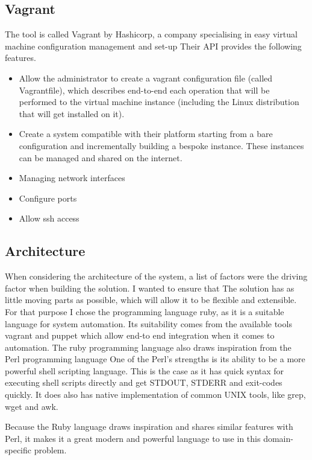 \documentclass{article}
\begin{document}
\subsection{Vagrant}
The tool is called Vagrant by Hashicorp, a company specialising in easy virtual machine configuration management and set-up Their API provides the following features.

	\begin{itemize}
		\item
			Allow the administrator to create a vagrant configuration file (called Vagrantfile), which describes end-to-end each operation that will be performed to the virtual machine instance (including the Linux distribution that will get installed on it).
		\item
			Create a system compatible with their platform starting from a bare configuration and incrementally building a bespoke instance. These instances can be managed and shared on the internet.
		\item
			Managing network interfaces
		\item
			Configure ports
		\item 
			Allow \gls{ssh} access
	\end{itemize}

\subsection{Architecture}
When considering the architecture of the system, a list of factors were the driving factor when building the solution. I wanted to ensure that The solution has as little moving parts as possible, which will allow it to be flexible and extensible. For that purpose I chose the programming language ruby, as it is a suitable language for system automation. Its suitability comes from the available tools vagrant and puppet which allow end-to end integration when it comes to automation. The ruby programming language also draws inspiration from the Perl programming language One of the Perl's strengths is its ability to be a more powerful shell scripting language. This is the case as it has quick syntax for executing shell scripts directly and get STDOUT, STDERR and exit-codes quickly. It does also has native implementation of common UNIX tools, like grep, wget and awk.

Because the Ruby language draws inspiration and shares similar features with Perl, it makes it a great modern and powerful language to use in this domain-specific problem.
\end{document}
